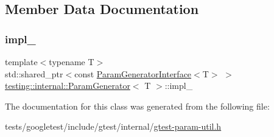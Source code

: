 \subsection{Member Data Documentation}
\mbox{\label{classtesting_1_1internal_1_1ParamGenerator_a2ea0b72d470d5a961272c2b818a3f78d}} 
\subsubsection{\texorpdfstring{impl\+\_\+}{impl\_}}
{\footnotesize\ttfamily template$<$typename T$>$ \\
std\+::shared\+\_\+ptr$<$const \hyperlink{classtesting_1_1internal_1_1ParamGeneratorInterface}{Param\+Generator\+Interface}$<$T$>$ $>$ \hyperlink{classtesting_1_1internal_1_1ParamGenerator}{testing\+::internal\+::\+Param\+Generator}$<$ T $>$\+::impl\+\_\+\hspace{0.3cm}{\ttfamily [private]}}



The documentation for this class was generated from the following file\+:\begin{DoxyCompactItemize}
\item 
tests/googletest/include/gtest/internal/\hyperlink{gtest-param-util_8h}{gtest-\/param-\/util.\+h}\end{DoxyCompactItemize}
